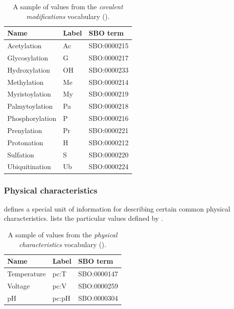 \begin{table}[h]
  \centering
  \begin{tabular}{l>{\ttfamily}l>{\ttfamily}l}
    \toprule
    \textbf{Name}   & \textbf{\rmfamily Label} & \textbf{\rmfamily SBO term} \\
    \midrule
    Acetylation     & Ac    & SBO:0000215\\
    Glycosylation   & G     & SBO:0000217\\
    Hydroxylation   & OH    & SBO:0000233\\
    Methylation     & Me    & SBO:0000214\\
    Myristoylation  & My    & SBO:0000219\\
    Palmytoylation  & Pa    & SBO:0000218\\
    Phosphorylation & P     & SBO:0000216\\
    Prenylation     & Pr    & SBO:0000221\\
    Protonation     & H     & SBO:0000212\\
    Sulfation       & S     & SBO:0000220\\
    Ubiquitination  & Ub    & SBO:0000224\\
    \bottomrule
  \end{tabular}
  \caption{A sample of values from the \emph{covalent modifications} vocabulary
    ().}
  \label{tab:covalent-mod-cv}
\end{table}


\subsubsection{Physical characteristics}
\label{sec:physical-characteristics-cv}

\SBGNPDLone defines a special unit of information for describing certain common physical characteristics.   lists the particular values defined by \SBGNPDLone. 

\begin{table}[h]
  \centering
  \begin{tabular}{l>{\ttfamily}l>{\ttfamily}l}
    \toprule
    \textbf{Name}   & \textbf{\rmfamily Label} & \textbf{\rmfamily SBO term} \\
    \midrule
    Temperature   & pc:T  & SBO:0000147\\
    Voltage       & pc:V  & SBO:0000259\\
    pH            & pc:pH & SBO:0000304\\
    \bottomrule
  \end{tabular}
  \caption{A sample of values from the \emph{physical
      characteristics} vocabulary ().}
  \label{tab:physical-characteristics-cv}
\end{table}


